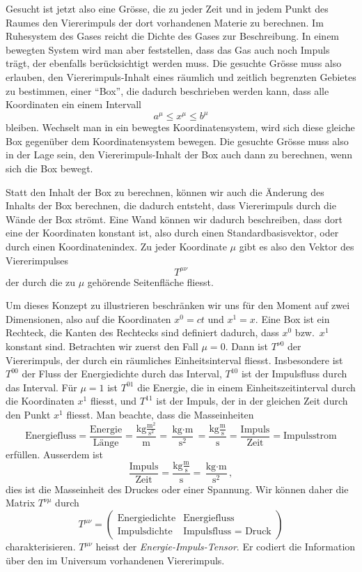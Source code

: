 Gesucht ist jetzt also eine Grösse, die zu jeder Zeit und in jedem
Punkt des Raumes den Viererimpuls der dort vorhandenen Materie zu
berechnen.
Im Ruhesystem des Gases reicht die Dichte des Gases zur Beschreibung.
In einem bewegten System wird man aber feststellen, dass das Gas auch
noch Impuls trägt, der ebenfalls berücksichtigt werden muss.
Die gesuchte Grösse muss also erlauben, den Viererimpuls-Inhalt eines
räumlich und zeitlich begrenzten Gebietes zu bestimmen, einer ``Box'', 
die dadurch beschrieben werden kann, dass alle Koordinaten ein einem
Intervall
\[
a^\mu \le x^\mu \le b^\mu
\]
bleiben.
Wechselt man in ein bewegtes Koordinatensystem, wird sich diese
gleiche Box gegenüber dem Koordinatensystem bewegen.
Die gesuchte Grösse muss also in der Lage sein, den Viererimpuls-Inhalt
der Box auch dann zu berechnen, wenn sich die Box bewegt.

Statt den Inhalt der Box zu berechnen, können wir auch die Änderung des
Inhalts der Box berechnen, die dadurch entsteht, dass Viererimpuls durch
die Wände der Box strömt.
Eine Wand können wir dadurch beschreiben, dass dort eine der Koordinaten
konstant ist, also durch einen Standardbasisvektor, oder durch einen
Koordinatenindex.
Zu jeder Koordinate $\mu$ gibt es also den Vektor des Viererimpulses
\[
T^{\mu\nu}
\]
der durch die zu $\mu$ gehörende Seitenfläche fliesst.

Um dieses Konzept zu illustrieren beschränken wir uns für den Moment
auf zwei Dimensionen, also auf die Koordinaten $x^0=ct$ und $x^1=x$.
Eine Box ist ein Rechteck, die Kanten des Rechtecks sind definiert
dadurch, dass $x^0$ bzw.~$x^1$ konstant sind.
Betrachten wir zuerst den Fall $\mu=0$.
Dann ist $T^{\nu0}$ der Viererimpuls, der durch ein räumliches
Einheitsinterval fliesst.
Insbesondere ist $T^{00}$ der Fluss der Energiedichte durch das Interval,
$T^{10}$ ist der Impulsfluss durch das Interval.
Für $\mu=1$ ist $T^{01}$ die Energie, die in einem Einheitszeitinterval
durch die Koordinaten $x^1$ fliesst, und $T^{11}$ ist der Impuls, der in der
gleichen Zeit durch den Punkt $x^1$ fliesst.
Man beachte, dass die Masseinheiten
\[
\text{Energiefluss}
=
\frac{\text{Energie}}{\text{Länge}}
=
\frac{\text{kg}\frac{\text{m}^2}{\text{s}^2}}{\text{m}}
=
\frac{\text{kg}\cdot\text{m}}{\text{s}^2}
=
\frac{\text{kg}\frac{\text{m}}{\text{s}}}{\text{s}}
=
\frac{\text{Impuls}}{\text{Zeit}}
=
\text{Impulsstrom}
\]
erfüllen.
Ausserdem ist 
\[
\frac{\text{Impuls}}{\text{Zeit}}
=
\frac{\text{kg}\frac{\text{m}}{\text{s}}}{\text{s}}
=
\frac{\text{kg}\cdot\text{m}}{\text{s}^2},
\]
dies ist die Masseinheit des Druckes oder einer Spannung.
Wir können daher die Matrix $T^{\nu\mu}$
durch
\[
T^{\mu\nu}
=
\begin{pmatrix}
\text{Energiedichte}
&\text{Energiefluss}
\\
\text{Impulsdichte}
&\text{Impulsfluss = Druck}
\end{pmatrix}
\]
charakterisieren.
$T^{\mu\nu}$ heisst der {\em Energie-Impuls-Tensor}.
Er codiert die Information über den im Universum vorhandenen
Viererimpuls.

